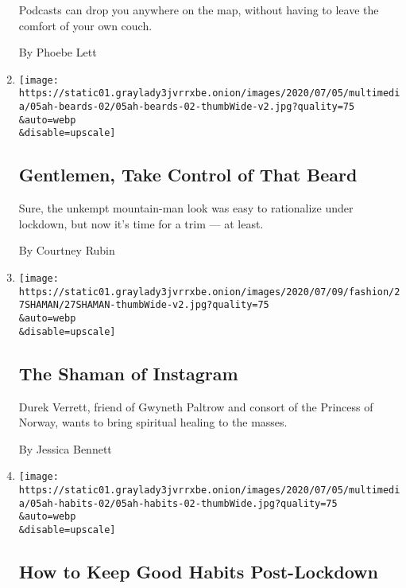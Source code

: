 \begin{enumerate}
  Podcasts can drop you anywhere on the map, without having to leave the
  comfort of your own couch.

  By Phoebe Lett
\item
  \href{/2020/07/03/at-home/coronavirus-beards.html}{}

  \texttt{[image: https://static01.graylady3jvrrxbe.onion/images/2020/07/05/multimedia/05ah-beards-02/05ah-beards-02-thumbWide-v2.jpg?quality=75\\\&auto=webp\\\&disable=upscale]}

  \hypertarget{gentlemen-take-control-of-that-beard}{%
  \subsection{Gentlemen, Take Control of That
  Beard}\label{gentlemen-take-control-of-that-beard}}

  Sure, the unkempt mountain-man look was easy to rationalize under
  lockdown, but now it's time for a trim --- at least.

  By Courtney Rubin
\item
  \href{/2020/07/03/style/self-care/durek-verrett-instagram-shaman.html}{}

  \texttt{[image: https://static01.graylady3jvrrxbe.onion/images/2020/07/09/fashion/27SHAMAN/27SHAMAN-thumbWide-v2.jpg?quality=75\\\&auto=webp\\\&disable=upscale]}

  \hypertarget{the-shaman-of-instagram}{%
  \subsection{The Shaman of Instagram}\label{the-shaman-of-instagram}}

  Durek Verrett, friend of Gwyneth Paltrow and consort of the Princess
  of Norway, wants to bring spiritual healing to the masses.

  By Jessica Bennett
\item
  \href{/2020/07/02/at-home/coronavirus-keep-good-habits.html}{}

  \texttt{[image: https://static01.graylady3jvrrxbe.onion/images/2020/07/05/multimedia/05ah-habits-02/05ah-habits-02-thumbWide.jpg?quality=75\\\&auto=webp\\\&disable=upscale]}

  \hypertarget{how-to-keep-good-habits-post-lockdown}{%
  \subsection{How to Keep Good Habits
  Post-Lockdown}\label{how-to-keep-good-habits-post-lockdown}}


\end{enumerate}
